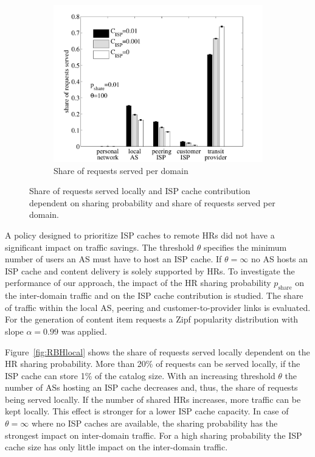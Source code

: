 \begin{figure}[ht]
\begin{subfigure}[t]{0.49\textwidth}
\includegraphics[width=\textwidth]{hierarchical/simulative/figures/RBHall}
\caption{Share of requests served per domain}
\label{fig:RBHall}
\end{subfigure}
\caption{Share of requests served locally and ISP cache contribution dependent on sharing probability and share of requests served per domain.}
\end{figure}

A policy designed to prioritize ISP caches to remote HRs did not have a significant impact on traffic savings.
The threshold $\theta$ specifies the minimum number of users an AS must have to host an ISP cache. If $\theta=\infty$ no AS hosts an ISP cache and content delivery is solely supported by HRs.
To investigate the performance of our approach, the impact of the HR sharing probability $p_\text{share}$ on the inter-domain traffic and on the ISP cache contribution is studied. The share of traffic within the local AS, peering and customer-to-provider links is evaluated.
For the generation of content item requests a Zipf popularity distribution with slope $\alpha=0.99$ was applied.


Figure~\ref{fig:RBHlocal} shows the share of requests served locally dependent on the HR sharing probability. More than 20\% of requests can be served locally, if the ISP cache can store 1\% of the catalog size. With an increasing threshold $\theta$ the number of ASs hosting an ISP cache decreases and, thus, the share of requests being served locally. If the number of shared HRs increases, more traffic can be kept locally. This effect is stronger for a lower ISP cache capacity. In case of $\theta=\infty$ where no ISP caches are available, the sharing probability has the strongest impact on inter-domain traffic. For a high sharing probability the ISP cache size has only little impact on the inter-domain traffic.

